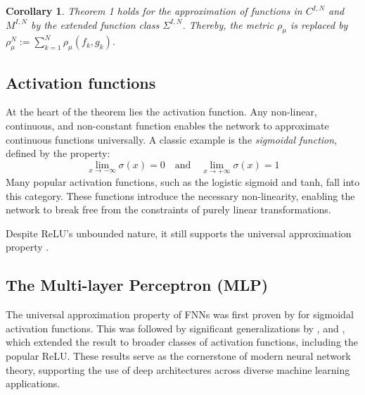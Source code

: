\documentclass{article}
\newtheorem{corollary}{Corollary}[theorem]
\theoremstyle{definition} \newtheorem{definition}{Definition}
\theoremstyle{remark} \newtheorem{remark}{Remark}
\newcounter{ct}
\begin{document}
\begin{corollary}%
Theorem 1 holds for the approximation of functions in \( C^{I,N} \) and \( M^{I,N} \) by the extended function class \( \Sigma^{I,N} \). Thereby, the metric \( \rho_{\mu} \) is replaced by \( \rho_{\mu}^N := \sum_{k=1}^{N} \rho_{\mu}(f_k, g_k) \).
\end{corollary}

\subsection{Activation functions} %
At the heart of the theorem lies the activation function. Any non-linear, continuous, and non-constant function enables the network to approximate continuous functions universally.
A classic example is the \textit{sigmoidal function}, defined by the property:
\[
\lim_{x \to -\infty} \sigma(x) = 0 \quad \text{and} \quad \lim_{x \to +\infty} \sigma(x) = 1
\]
Many popular activation functions, such as the logistic sigmoid and tanh, fall into this category.
These functions introduce the necessary non-linearity, enabling the network to break free from the constraints of purely linear transformations.

Despite ReLU's unbounded nature, it still supports the universal approximation property \citep{yarotsky2017error}.

\citep{mhaskar2019function}

\subsection{The Multi-layer Perceptron (MLP)}
The universal approximation property of FNNs was first proven by \citep{cybenko1989approximation} for sigmoidal activation functions. This was followed by significant generalizations by \citep{hornik1989multilayer}, \citep{funahashi1989approximate} and \citep{hechtnielsen1992backpropagation}, which extended the result to broader classes of activation functions, including the popular ReLU.
These results serve as the cornerstone of modern neural network theory, supporting the use of deep architectures across diverse machine learning applications.

\end{document}
